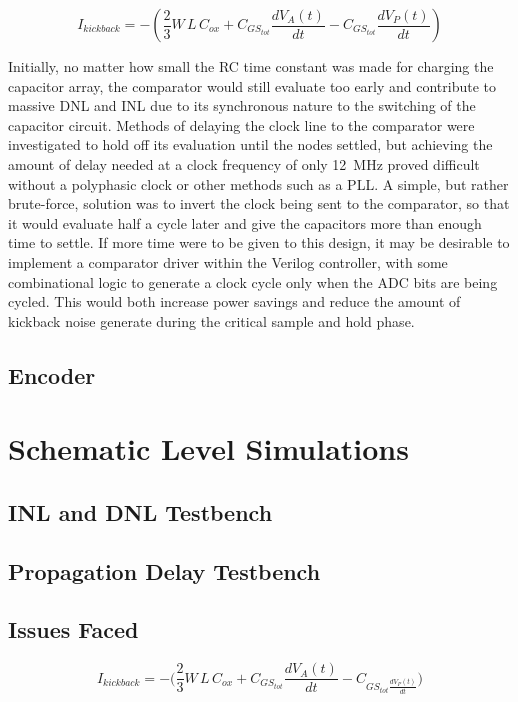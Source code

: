\documentclass[11pt,letterpaper]{article}
\begin{document}
\begin{equation}
    I_{kickback} = -\left(\frac{2}{3}W\,L\,C_{ox} + C_{GS_{tot}}\frac{dV_A(t)}{dt} - C_{GS_{tot}}\frac{dV_P(t)}{dt}\right)\label{eq:kickback}
\end{equation}

Initially, no matter how small the RC time constant was made for charging the capacitor array, the comparator would still evaluate too early and contribute to massive DNL and INL due to its synchronous nature to the switching of the capacitor circuit. Methods of delaying the clock line to the comparator were investigated to hold off its evaluation until the nodes settled, but achieving the amount of delay needed at a clock frequency of only \qty{12}{\MHz} proved difficult without a polyphasic clock or other methods such as a PLL\@. A simple, but rather brute-force, solution was to invert the clock being sent to the comparator, so that it would evaluate half a cycle later and give the capacitors more than enough time to settle. If more time were to be given to this design, it may be desirable to implement a comparator driver within the Verilog controller, with some combinational logic to generate a clock cycle only when the ADC bits are being cycled. This would both increase power savings and reduce the amount of kickback noise generate during the critical sample and hold phase.

\subsection{Encoder}

\section{Schematic Level Simulations}

\subsection{INL and DNL Testbench}


\subsection{Propagation Delay Testbench}

\subsection{Issues Faced}

\begin{equation}
    I_{kickback} = -\biggl(\frac{2}{3}W\,L\,C_{ox} + C_{GS_{tot}}\frac{dV_A(t)}{dt} - C_{GS_{tot}\frac{dV_P(t)}{dt}}\biggr)\label{eq:kickback}
\end{equation}
\end{document}
